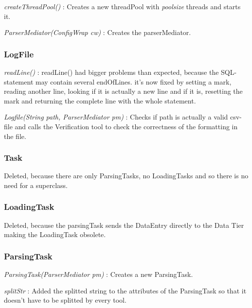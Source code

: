\textit{createThreadPool()} : Creates a new threadPool with \textit{poolsize} threads and starts it. \newline\newline

\textit{ParserMediator(ConfigWrap cw)} : Creates the parserMediator.

\subsubsection{LogFile} 

\textit{readLine()} : readLine() had bigger problems than expected, because the SQL-statement may contain several endOfLines. it's now 
fixed by setting a mark, reading another line, looking if it is actually a new line and if it is, resetting the mark and returning
the complete line with the whole statement. \newline\newline

\textit{Logfile(String path, ParserMediator pm)} : Checks if path is actually a valid csv-file and calls the Verification tool to check the
correctness of the formatting in the file.

\subsubsection{Task}

Deleted, because there are only ParsingTasks, no LoadingTasks and so there is no need for a superclass.

\subsubsection{LoadingTask}

Deleted, because the parsingTask sends the DataEntry directly to the Data Tier making the LoadingTask obsolete.

\subsubsection{ParsingTask}

\textit{ParsingTask(ParserMediator pm)} : Creates a new ParsingTask.\newline\newline

\textit{splitStr} : Added the splitted string to the attributes of the ParsingTask so that it doesn't have to be splitted by every tool.


